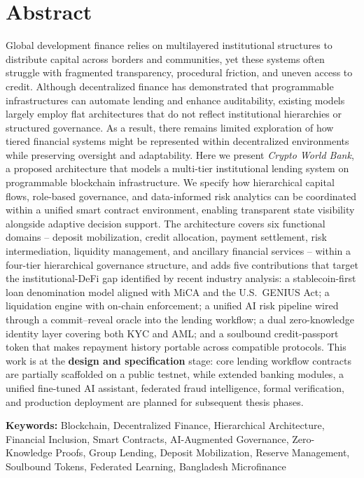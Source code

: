 \documentclass[12pt,a4paper]{report}
\begin{document}
\chapter*{Abstract}
{}

Global development finance relies on multilayered institutional structures to distribute capital across borders and communities, yet these systems often struggle with fragmented transparency, procedural friction, and uneven access to credit. Although decentralized finance has demonstrated that programmable infrastructures can automate lending and enhance auditability, existing models largely employ flat architectures that do not reflect institutional hierarchies or structured governance. As a result, there remains limited exploration of how tiered financial systems might be represented within decentralized environments while preserving oversight and adaptability. Here we present \textit{Crypto World Bank}, a proposed architecture that models a multi-tier institutional lending system on programmable blockchain infrastructure. We specify how hierarchical capital flows, role-based governance, and data-informed risk analytics can be coordinated within a unified smart contract environment, enabling transparent state visibility alongside adaptive decision support. The architecture covers six functional domains -- deposit mobilization, credit allocation, payment settlement, risk intermediation, liquidity management, and ancillary financial services -- within a four-tier hierarchical governance structure, and adds five contributions that target the institutional-DeFi gap identified by recent industry analysis: a stablecoin-first loan denomination model aligned with MiCA and the U.S.\ GENIUS Act; a liquidation engine with on-chain enforcement; a unified AI risk pipeline wired through a commit--reveal oracle into the lending workflow; a dual zero-knowledge identity layer covering both KYC and AML; and a soulbound credit-passport token that makes repayment history portable across compatible protocols. This work is at the \textbf{design and specification} stage: core lending workflow contracts are partially scaffolded on a public testnet, while extended banking modules, a unified fine-tuned AI assistant, federated fraud intelligence, formal verification, and production deployment are planned for subsequent thesis phases.

\vspace{0.5em}
\noindent\textbf{Keywords:} Blockchain, Decentralized Finance, Hierarchical Architecture, Financial Inclusion, Smart Contracts, AI-Augmented Governance, Zero-Knowledge Proofs, Group Lending, Deposit Mobilization, Reserve Management, Soulbound Tokens, Federated Learning, Bangladesh Microfinance
\end{document}

